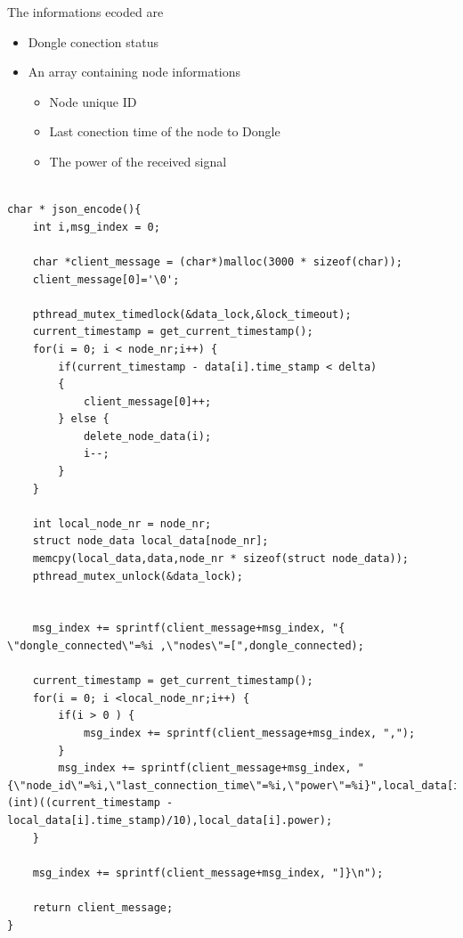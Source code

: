 The informations ecoded are
\begin{itemize}

\item Dongle conection status
\item An array containing node informations
\begin{itemize}

	\item Node unique ID
	\item Last conection time of the node to Dongle
	\item The power of the received signal

	\end{itemize}
\end{itemize}
\lstset{numbers=none, mathescape=true, nolol=false,caption=Data Collection use of mutex,label=lst:task}
\begin{lstlisting}

char * json_encode(){
	int i,msg_index = 0;

	char *client_message = (char*)malloc(3000 * sizeof(char));
	client_message[0]='\0';	

	pthread_mutex_timedlock(&data_lock,&lock_timeout); 
    current_timestamp = get_current_timestamp();
	for(i = 0; i < node_nr;i++) {
		if(current_timestamp - data[i].time_stamp < delta)
		{
			client_message[0]++;
		} else {
			delete_node_data(i);
			i--;
		}
	}
	
	int local_node_nr = node_nr;
	struct node_data local_data[node_nr];	
	memcpy(local_data,data,node_nr * sizeof(struct node_data));
	pthread_mutex_unlock(&data_lock);  
	

	msg_index += sprintf(client_message+msg_index, "{ \"dongle_connected\"=%i ,\"nodes\"=[",dongle_connected);
	
    current_timestamp = get_current_timestamp();
	for(i = 0; i <local_node_nr;i++) {
		if(i > 0 ) {
			msg_index += sprintf(client_message+msg_index, ",");
		}	
		msg_index += sprintf(client_message+msg_index, "{\"node_id\"=%i,\"last_connection_time\"=%i,\"power\"=%i}",local_data[i].id,(int)((current_timestamp - local_data[i].time_stamp)/10),local_data[i].power);	
	}

	msg_index += sprintf(client_message+msg_index, "]}\n");

	return client_message;
}
\end{lstlisting}

\clearpage
 
